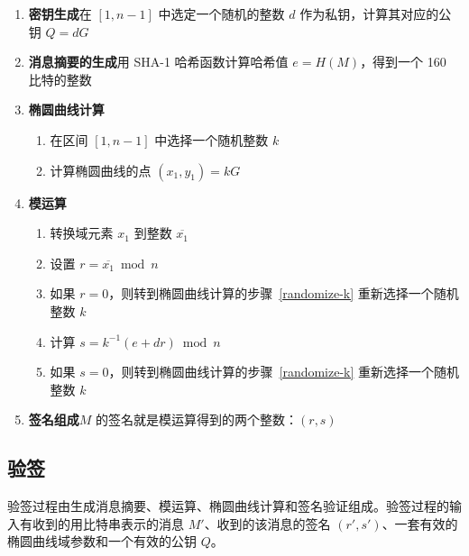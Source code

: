 \documentclass[a4paper,10pt]{article}
\begin{document}
\begin{enumerate}
  \item \textbf{密钥生成}\quad 在 \([1,n-1]\) 中选定一个随机的整数 \(d\) 作为私钥，计算其对应的公钥 \(Q=dG\)
  \item \textbf{消息摘要的生成}\quad 用 SHA-1 哈希函数计算哈希值 \(e=H(M)\)，得到一个 160 比特的整数
  \item \textbf{椭圆曲线计算}
    \begin{enumerate}
      \item\label{randomize-k} 在区间 \([1,n-1]\) 中选择一个随机整数 \(k\)
      \item 计算椭圆曲线的点 \((x_1,y_1)=kG\)
    \end{enumerate}
  \item \textbf{模运算}
    \begin{enumerate}
      \item 转换域元素 \(x_1\) 到整数 \(\overline{x_1}\)
      \item 设置 \(r=\overline{x_1} \bmod n\) 
      \item 如果 \(r=0\)，则转到椭圆曲线计算的步骤~\ref{randomize-k} 重新选择一个随机整数 \(k\)
      \item 计算 \(s=k^{-1}(e+dr)\bmod n\)
      \item 如果 \(s=0\)，则转到椭圆曲线计算的步骤~\ref{randomize-k} 重新选择一个随机整数 \(k\)
    \end{enumerate}
  \item \textbf{签名组成}\quad \(M\) 的签名就是模运算得到的两个整数：\((r,s)\)
\end{enumerate}

\subsection{验签}
验签过程由生成消息摘要、模运算、椭圆曲线计算和签名验证组成。验签过程的输入有收到的用比特串表示的消息 \(M'\)、收到的该消息的签名 \((r',s')\)、一套有效的椭圆曲线域参数和一个有效的公钥 \(Q\)。
\end{document}
